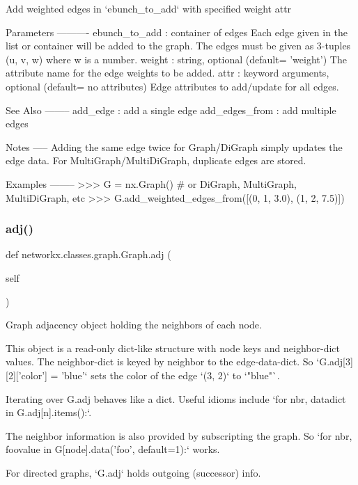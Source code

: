 \begin{DoxyVerb}Add weighted edges in `ebunch_to_add` with specified weight attr

Parameters
----------
ebunch_to_add : container of edges
    Each edge given in the list or container will be added
    to the graph. The edges must be given as 3-tuples (u, v, w)
    where w is a number.
weight : string, optional (default= 'weight')
    The attribute name for the edge weights to be added.
attr : keyword arguments, optional (default= no attributes)
    Edge attributes to add/update for all edges.

See Also
--------
add_edge : add a single edge
add_edges_from : add multiple edges

Notes
-----
Adding the same edge twice for Graph/DiGraph simply updates
the edge data. For MultiGraph/MultiDiGraph, duplicate edges
are stored.

Examples
--------
>>> G = nx.Graph()  # or DiGraph, MultiGraph, MultiDiGraph, etc
>>> G.add_weighted_edges_from([(0, 1, 3.0), (1, 2, 7.5)])
\end{DoxyVerb}
 \mbox{\label{classnetworkx_1_1classes_1_1graph_1_1Graph_a350941a0803b7249b9ea692daa4d0b58}} 
\subsubsection{\texorpdfstring{adj()}{adj()}}
{\footnotesize\ttfamily def networkx.\+classes.\+graph.\+Graph.\+adj (\begin{DoxyParamCaption}\item[{}]{self }\end{DoxyParamCaption})}

\begin{DoxyVerb}Graph adjacency object holding the neighbors of each node.

This object is a read-only dict-like structure with node keys
and neighbor-dict values.  The neighbor-dict is keyed by neighbor
to the edge-data-dict.  So `G.adj[3][2]['color'] = 'blue'` sets
the color of the edge `(3, 2)` to `"blue"`.

Iterating over G.adj behaves like a dict. Useful idioms include
`for nbr, datadict in G.adj[n].items():`.

The neighbor information is also provided by subscripting the graph.
So `for nbr, foovalue in G[node].data('foo', default=1):` works.

For directed graphs, `G.adj` holds outgoing (successor) info.
\end{DoxyVerb}
 \mbox{\label{classnetworkx_1_1classes_1_1graph_1_1Graph_ae0a69c5d07c08d2f3e932f73845989ff}} 
